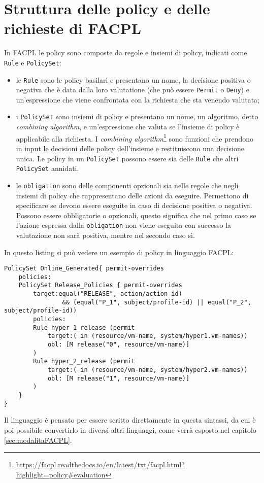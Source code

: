 \section{Struttura delle policy e delle richieste di FACPL}
In FACPL le policy sono composte da regole e insiemi di policy, indicati come \texttt{Rule} e \texttt{PolicySet}:
\begin{itemize}
    \item le \texttt{Rule} sono le policy basilari e presentano un nome, la decisione positiva o negativa che è data dalla loro valutatione (che può essere \texttt{Permit} o \texttt{Deny}) e un'espressione che viene confrontata con la richiesta che sta venendo valutata;
    \item i \texttt{PolicySet} sono insiemi di policy e presentano un nome, un algoritmo, detto \emph{combining algorithm}, e un'espressione che valuta se l'insieme di policy è applicabile alla richiesta. I \emph{combining algorithm}\footnote{\url{https://facpl.readthedocs.io/en/latest/txt/facpl.html?highlight=policy\#evaluation}} sono funzioni che prendono in input le decisioni delle policy dell'insieme e restituiscono una decisione unica. Le policy in un \texttt{PolicySet} possono essere sia delle \texttt{Rule} che altri \texttt{PolicySet} annidati.
    \item le \texttt{obligation} sono delle componenti opzionali sia nelle regole che negli insiemi di policy che rappresentano delle azioni da eseguire. Permettono di specificare se devono essere eseguite in caso di decisione positiva o negativa. Possono essere obbligatorie o opzionali, questo significa che nel primo caso se l'azione espressa dalla \texttt{obligation} non viene eseguita con successo la valutazione non sarà positiva, mentre nel secondo caso sì.
\end{itemize}
In questo listing si può vedere un esempio di policy in linguaggio FACPL:
\begin{lstlisting}[label={code:policyFACPL}, caption={Esempio di policy in FACPL}, language=FACPL, basicstyle=\fontsize{9.5}{10}\ttfamily]
PolicySet Online_Generated{ permit-overrides
	policies:
	PolicySet Release_Policies { permit-overrides
  		target:equal("RELEASE", action/action-id)
    			&& (equal("P_1", subject/profile-id) || equal("P_2", subject/profile-id))
  		policies:
    	Rule hyper_1_release (permit
      		target:( in (resource/vm-name, system/hyper1.vm-names))
      		obl: [M release("0", resource/vm-name)]
    	)
    	Rule hyper_2_release (permit
      		target:( in (resource/vm-name, system/hyper2.vm-names))
      		obl: [M release("1", resource/vm-name)]
    	)
  	}
}
\end{lstlisting}
Il linguaggio è pensato per essere scritto direttamente in questa sintassi, da cui è poi possibile convertirlo in diversi altri linguaggi, come verrà esposto nel capitolo \ref{sec:modalitaFACPL}.\par

